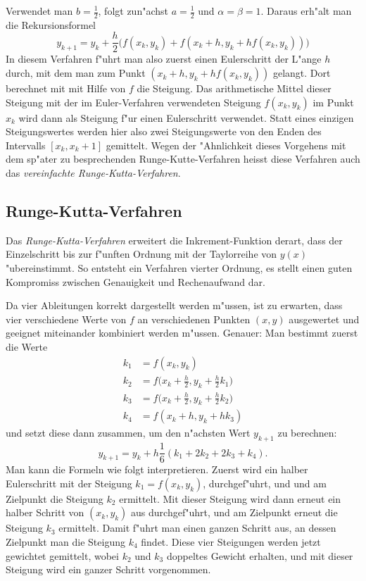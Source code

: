 Verwendet man $b=\frac12$, folgt zun"achst $a=\frac12$ und $\alpha=\beta=1$.
Daraus erh"alt man die Rekursionsformel
\begin{equation}
y_{k+1}=y_k+\frac{h}2\biggl(
f(x_k,y_k) + f(x_k+h, y_k + hf(x_k,y_k))
\biggr)
\label{numerik:simplified-runge-kutta}
\end{equation}
In diesem Verfahren f"uhrt man also zuerst einen Eulerschritt der L"ange
$h$ durch, mit dem man zum Punkt $(x_k+h, y_k+hf(x_k,y_k))$ gelangt.
Dort berechnet mit mit Hilfe von $f$ die Steigung.
Das arithmetische Mittel dieser Steigung mit der im Euler-Verfahren
verwendeten Steigung $f(x_k,y_k)$ im Punkt $x_k$ wird dann als
Steigung f"ur einen Eulerschritt verwendet.
Statt eines einzigen Steigungswertes werden hier also zwei Steigungswerte
von den Enden des Intervalls $[x_k,x_k+1]$ gemittelt.
Wegen der "Ahnlichkeit dieses Vorgehens mit dem sp"ater zu besprechenden
Runge-Kutte-Verfahren heisst diese Verfahren auch das {\em
vereinfachte Runge-Kutta-Verfahren}.

\subsection{Runge-Kutta-Verfahren\label{subsection:numerik:runge-kutta}}
Das {\em Runge-Kutta-Verfahren} erweitert die Inkrement-Funktion derart,
dass der Einzelschritt bis zur f"unften Ordnung mit der Taylorreihe von
$y(x)$ "ubereinstimmt.
So entsteht ein Verfahren vierter Ordnung, es stellt einen guten Kompromiss
zwischen Genauigkeit und Rechenaufwand dar.

Da vier Ableitungen korrekt dargestellt werden m"ussen, ist zu erwarten,
dass vier verschiedene Werte von $f$ an verschiedenen Punkten $(x,y)$
ausgewertet und geeignet miteinander kombiniert werden m"ussen.
Genauer: Man bestimmt zuerst die Werte
\begin{align*}
k_1&=f(x_k,y_k)\\
k_2&=f\biggl(x_k+\frac{h}2,y_k+\frac{h}2k_1\biggr)\\
k_3&=f\biggl(x_k+\frac{h}2,y_k+\frac{h}2k_2\biggr)\\
k_4&=f(x_k+h, y_k+hk_3)
\end{align*}
und setzt diese dann zusammen, um den n"achsten Wert $y_{k+1}$
zu berechnen:
\begin{equation}
y_{k+1} = y_k + h\frac{1}6(k_1 + 2k_2 + 2k_3 + k_4).
\label{numerik:runge-kutta-rekursion}
\end{equation}
Man kann die Formeln wie folgt interpretieren.
Zuerst wird ein halber Eulerschritt mit der Steigung $k_1=f(x_k,y_k)$,
durchgef"uhrt, und und am Zielpunkt die Steigung $k_2$ ermittelt.
Mit dieser Steigung wird dann erneut ein halber Schritt von $(x_k,y_k)$
aus durchgef"uhrt, und am Zielpunkt erneut die Steigung $k_3$ ermittelt.
Damit f"uhrt man einen ganzen Schritt aus, an dessen Zielpunkt man die
Steigung $k_4$ findet.
Diese vier Steigungen werden jetzt gewichtet gemittelt, wobei
$k_2$ und $k_3$ doppeltes Gewicht erhalten, und mit dieser
Steigung wird ein ganzer Schritt vorgenommen.

